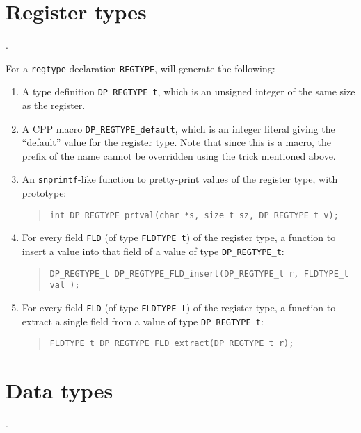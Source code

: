 \documentclass[a4paper,11pt,twoside]{report}
\begin{document}
\section{Register types}\label{sec:c-regtype}. 

For a \texttt{regtype} declaration \texttt{REGTYPE}, \Mac will
generate the following: 

\begin{enumerate}

\item A type definition \texttt{DP\_REGTYPE\_t}, which is an unsigned
  integer of the same size as the register. 

\item A CPP macro \texttt{DP\_REGTYPE\_default}, which is an integer
  literal giving the ``default'' value for the register type.  Note
  that since this is a macro, the prefix of the name cannot be
  overridden using the trick mentioned above. 

\item An \texttt{snprintf}-like function to pretty-print values of the
  register type, with prototype:
  \begin{quote}
    \texttt{int DP\_REGTYPE\_prtval(char *s, size\_t sz, DP\_REGTYPE\_t v);}
  \end{quote}

\item For every field \texttt{FLD} (of type \texttt{FLDTYPE\_t}) of the
  register type, a function to insert a value into that field of a value
  of type \texttt{DP\_REGTYPE\_t}: 
  \begin{quote}
    \texttt{DP\_REGTYPE\_t DP\_REGTYPE\_FLD\_insert(DP\_REGTYPE\_t r, FLDTYPE\_t val );}
  \end{quote}

\item For every field \texttt{FLD} (of type \texttt{FLDTYPE\_t}) of the
  register type, a function to extract a single field from a value
  of type \texttt{DP\_REGTYPE\_t}: 
  \begin{quote}
    \texttt{FLDTYPE\_t DP\_REGTYPE\_FLD\_extract(DP\_REGTYPE\_t r);}
  \end{quote}

\end{enumerate}

\section{Data types}\label{sec:c-datatype}. 
\end{document}
